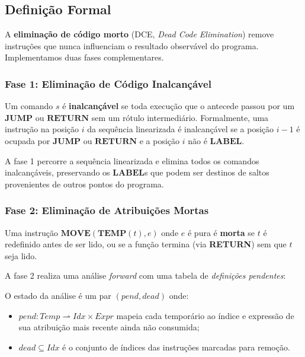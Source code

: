 \subsection{Definição Formal}

A \textbf{eliminação de código morto} (DCE, \emph{Dead Code Elimination})
remove instruções que nunca influenciam o resultado observável do programa.
Implementamos duas fases complementares.

\subsubsection*{Fase 1: Eliminação de Código Inalcançável}

\begin{Definition}\label{def:unreachable}
  Um comando $s$ é \textbf{inalcançável} se toda execução que o antecede passou
  por um $\mathbf{JUMP}$ ou $\mathbf{RETURN}$ sem um rótulo intermediário.
  Formalmente, uma instrução na posição $i$ da sequência linearizada é
  inalcançável se a posição $i-1$ é ocupada por $\mathbf{JUMP}$ ou
  $\mathbf{RETURN}$ e a posição $i$ não é $\mathbf{LABEL}$.
\end{Definition}

A fase 1 percorre a sequência linearizada e elimina todos os comandos
inalcançáveis, preservando os $\mathbf{LABEL}$s que podem ser destinos de
saltos provenientes de outros pontos do programa.

\subsubsection*{Fase 2: Eliminação de Atribuições Mortas}

\begin{Definition}\label{def:dead-assign}
  Uma instrução $\mathbf{MOVE}(\mathbf{TEMP}(t), e)$ onde $e$ é pura é
  \textbf{morta} se $t$ é redefinido antes de ser lido, ou se a função
  termina (via \textbf{RETURN}) sem que $t$ seja lido.
\end{Definition}

A fase 2 realiza uma análise \emph{forward} com uma tabela de
\emph{definições pendentes}:

\begin{Definition}\label{def:dae-state}
  O estado da análise é um par $(\mathit{pend}, \mathit{dead})$ onde:
  \begin{itemize}
    \item $\mathit{pend} : \mathit{Temp} \rightharpoonup \mathit{Idx}
      \times \mathit{Expr}$ mapeia cada temporário ao índice e expressão
      de sua atribuição mais recente ainda não consumida;
    \item $\mathit{dead} \subseteq \mathit{Idx}$ é o conjunto de índices das
      instruções marcadas para remoção.
  \end{itemize}
\end{Definition}

